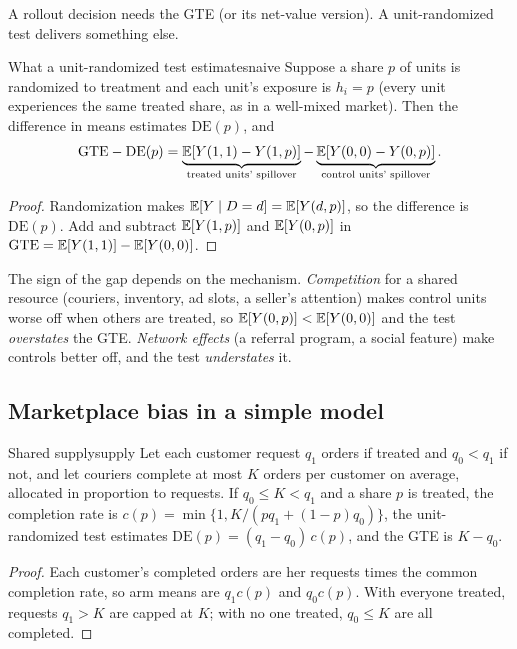 \documentclass[11pt]{article}
\begin{document}
A rollout decision needs the GTE (or its net-value version). A unit-randomized test delivers something else.

\begin{prop}{What a unit-randomized test estimates}{naive}
Suppose a share $p$ of units is randomized to treatment and each unit's exposure is $h_i = p$ (every unit
experiences the same treated share, as in a well-mixed market). Then the difference in means estimates
$\text{DE}(p)$, and
\[
  \text{GTE} - \text{DE}(p) = \underbrace{\mathbb{E}[Y(1,1) - Y(1,p)]}_{\text{treated units' spillover}} - \underbrace{\mathbb{E}[Y(0,0) - Y(0,p)]}_{\text{control units' spillover}} .
\]
\end{prop}
\begin{proof}
Randomization makes $\mathbb{E}[Y \mid D=d] = \mathbb{E}[Y(d,p)]$, so the difference is $\text{DE}(p)$. Add and subtract
$\mathbb{E}[Y(1,p)]$ and $\mathbb{E}[Y(0,p)]$ in $\text{GTE} = \mathbb{E}[Y(1,1)] - \mathbb{E}[Y(0,0)]$.
\end{proof}

The sign of the gap depends on the mechanism. \emph{Competition} for a shared resource (couriers, inventory, ad
slots, a seller's attention) makes control units worse off when others are treated, so $\mathbb{E}[Y(0,p)] < \mathbb{E}[Y(0,0)]$ and
the test \emph{overstates} the GTE. \emph{Network effects} (a referral program, a social feature) make controls
better off, and the test \emph{understates} it.

\subsection{Marketplace bias in a simple model}

\begin{prop}{Shared supply}{supply}
Let each customer request $q_1$ orders if treated and $q_0 < q_1$ if not, and let couriers complete at most $K$ orders
per customer on average, allocated in proportion to requests. If $q_0 \le K < q_1$ and a share $p$ is treated, the
completion rate is $c(p) = \min\{1, K/(pq_1 + (1-p)q_0)\}$, the unit-randomized test estimates
$\text{DE}(p) = (q_1 - q_0)\,c(p)$, and the GTE is $K - q_0$.
\end{prop}
\begin{proof}
Each customer's completed orders are her requests times the common completion rate, so arm means are $q_1c(p)$ and
$q_0c(p)$. With everyone treated, requests $q_1 > K$ are capped at $K$; with no one treated, $q_0 \le K$ are all
completed.
\end{proof}
\end{document}

